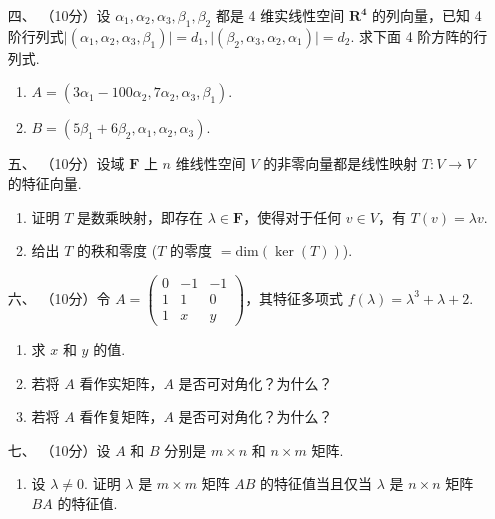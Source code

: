 \begin{enumerate}
\item [四、]（10分）设 $\alpha_1,\alpha_2,\alpha_3,\beta_1,\beta_2$ 都是 4 维实线性空间 $\mathbf{R^4}$ 的列向量，已知 4 阶行列式$\lvert (\alpha_1,\alpha_2,\alpha_3,\beta_1) \rvert=d_1,\lvert (\beta_2,\alpha_3,\alpha_2,\alpha_1) \rvert = d_2$.  求下面 4 阶方阵的行列式.
    \begin{enumerate}[label=(\arabic*)]
        \item $A=(3\alpha_1-100\alpha_2,7\alpha_2,\alpha_3,\beta_1)$.

        \item $B=(5\beta_1+6\beta_2,\alpha_1,\alpha_2,\alpha_3)$.
    \end{enumerate}

\item [五、]（10分）设域 $\mathbf{F}$ 上 $n$ 维线性空间 $V$ 的非零向量都是线性映射 $T:V\to V$ 的特征向量.
    \begin{enumerate}[label=(\arabic*)]
        \item 证明 $T$ 是数乘映射，即存在 $\lambda \in \mathbf{F}$，使得对于任何 $v \in V$，有 $T(v)=\lambda v$.

        \item 给出 $T$ 的秩和零度 ($T$ 的零度 $=\mathrm{dim}(\ker(T))$).
    \end{enumerate}

\item [六、]（10分）令 $A=\begin{pmatrix}0 & -1 & -1 \\ 1 & 1 & 0 \\ 1 & x & y\end{pmatrix}$，其特征多项式 $f(\lambda) = \lambda^3+\lambda+2$.
    \begin{enumerate}[label=(\arabic*)]
        \item 求 $x$ 和 $y$ 的值.

        \item 若将 $A$ 看作实矩阵，$A$ 是否可对角化？为什么？

        \item 若将 $A$ 看作复矩阵，$A$ 是否可对角化？为什么？
    \end{enumerate}

\item [七、]（10分）设 $A$ 和 $B$ 分别是 $m\times n$ 和 $n\times m$ 矩阵.
    \begin{enumerate}[label=(\arabic*)]
        \item 设 $\lambda \neq 0$. 证明 $\lambda$ 是 $m\times m$ 矩阵 $AB$ 的特征值当且仅当 $\lambda$ 是 $n\times n$ 矩阵 $BA$ 的特征值.


\end{enumerate}
\end{enumerate}
